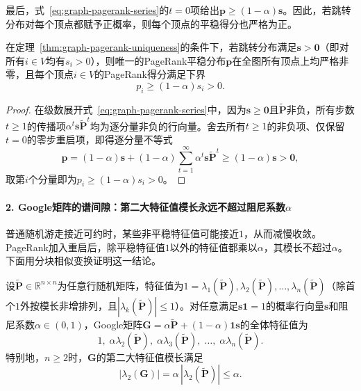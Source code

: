 最后，式~\eqref{eq:graph-pagerank-series}的$t=0$项给出$\bm p\geq(1-\alpha)\bm s$。因此，若跳转分布对每个顶点都赋予正概率，则每个顶点的平稳得分也严格为正。

\begin{theorem}[PageRank的全局严格非零性]
\label{thm:graph-pagerank-positivity}
在定理~\ref{thm:graph-pagerank-uniqueness}的条件下，若跳转分布满足$\bm s>\bm 0$（即对所有$i\in V$均有$s_i>0$），则唯一的PageRank平稳分布$\bm p$在全图所有顶点上均严格非零，且每个顶点$i\in V$的PageRank得分满足下界
\begin{equation}
  p_i \geq (1-\alpha)s_i > 0.
  \label{eq:graph-pagerank-positivity-bound}
\end{equation}
\end{theorem}

\begin{proof}
在级数展开式~\eqref{eq:graph-pagerank-series}中，因为$\bm s\geq\bm 0$且$\widetilde{\bm P}$非负，所有步数$t\geq 1$的传播项$\alpha^t\bm s\widetilde{\bm P}^t$均为逐分量非负的行向量。舍去所有$t\geq 1$的非负项、仅保留$t=0$的零步重启项，即得逐分量不等式
\[
  \bm p = (1-\alpha)\bm s + (1-\alpha)\sum_{t=1}^\infty\alpha^t\bm s\widetilde{\bm P}^t \geq (1-\alpha)\bm s > \bm 0,
\]
取第$i$个分量即为$p_i\geq(1-\alpha)s_i>0$。
\end{proof}

\paragraph{2. Google矩阵的谱间隙：第二大特征值模长永远不超过阻尼系数$\alpha$}

普通随机游走接近可约时，某些非平稳特征值可能接近$1$，从而减慢收敛。PageRank加入重启后，除平稳特征值$1$以外的特征值都乘以$\alpha$，其模长不超过$\alpha$。下面用分块相似变换证明这一结论。

\begin{theorem}[Google矩阵的特征值压缩定理]
\label{thm:pagerank-second-eigenvalue}
设$\widetilde{\bm P}\in\mathbb R^{n\times n}$为任意行随机矩阵，特征值为$1=\lambda_1(\widetilde{\bm P}),\lambda_2(\widetilde{\bm P}),\ldots,\lambda_n(\widetilde{\bm P})$（除首个$1$外按模长非增排列，且$|\lambda_k(\widetilde{\bm P})|\leq 1$）。对任意满足$\bm s\bm 1=1$的概率行向量$\bm s$和阻尼系数$\alpha\in(0,1)$，Google矩阵$\bm G=\alpha\widetilde{\bm P}+(1-\alpha)\bm 1\bm s$的全体特征值为
\[
  1,\; \alpha\lambda_2(\widetilde{\bm P}),\; \alpha\lambda_3(\widetilde{\bm P}),\; \ldots,\; \alpha\lambda_n(\widetilde{\bm P}).
\]
特别地，$n\geq2$时，$\bm G$的第二大特征值模长满足
\begin{equation}
  |\lambda_2(\bm G)| = \alpha\,|\lambda_2(\widetilde{\bm P})| \leq \alpha.
  \label{eq:pagerank-second-eigenvalue-bound}
\end{equation}
\end{theorem}

